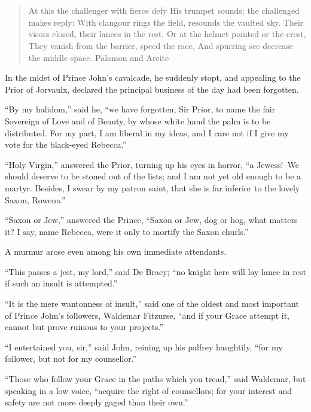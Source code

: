 \chapter{}

\begin{quote}
At this the challenger with fierce defy
His trumpet sounds; the challenged makes reply:
With clangour rings the field, resounds the vaulted sky.
Their visors closed, their lances in the rest,
Or at the helmet pointed or the crest,
They vanish from the barrier, speed the race,
And spurring see decrease the middle space.
Palamon and Arcite
\end{quote}

In the midst of Prince John's cavalcade, he suddenly stopt, and
appealing to the Prior of Jorvaulx, declared the principal business of
the day had been forgotten.

``By my halidom,'' said he, ``we have forgotten, Sir Prior, to name the
fair Sovereign of Love and of Beauty, by whose white hand the palm is to
be distributed. For my part, I am liberal in my ideas, and I care not if
I give my vote for the black-eyed Rebecca.''

``Holy Virgin,'' answered the Prior, turning up his eyes in horror, ``a
Jewess!--We should deserve to be stoned out of the lists; and I am not
yet old enough to be a martyr. Besides, I swear by my patron saint, that
she is far inferior to the lovely Saxon, Rowena.''

``Saxon or Jew,'' answered the Prince, ``Saxon or Jew, dog or hog, what
matters it? I say, name Rebecca, were it only to mortify the Saxon
churls.''

A murmur arose even among his own immediate attendants.

``This passes a jest, my lord,'' said De Bracy; ``no knight here will
lay lance in rest if such an insult is attempted.''

``It is the mere wantonness of insult,'' said one of the oldest and most
important of Prince John's followers, Waldemar Fitzurse, ``and if your
Grace attempt it, cannot but prove ruinous to your projects.''

``I entertained you, sir,'' said John, reining up his palfrey haughtily,
``for my follower, but not for my counsellor.''

``Those who follow your Grace in the paths which you tread,'' said
Waldemar, but speaking in a low voice, ``acquire the right of
counsellors; for your interest and safety are not more deeply gaged than
their own.''

